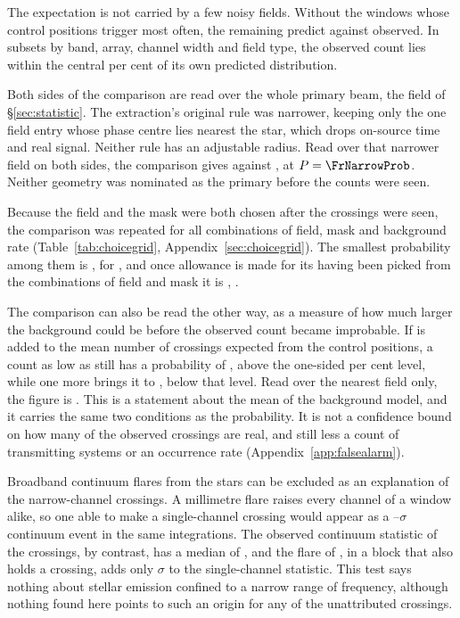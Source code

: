 The expectation is not carried by a few noisy fields. Without the
\BgTopNWord{} windows whose control positions trigger most often, the
remaining \BgDropTenNWin{} predict \BgDropTenExp{} against \BgDropTenObs{}
observed. In \BgConfInOf{} subsets by band, array, channel
width and field type, the observed count lies within the central
\CeCovPct{} per cent of its own predicted distribution.

Both sides of the comparison are read over the whole primary beam, the field
of \S\ref{sec:statistic}. The extraction's original rule was narrower,
keeping only the one field entry whose phase centre lies nearest the star,
which drops on-source time and real signal. Neither rule has an adjustable
radius. Read over that narrower field on both sides, the comparison gives
\FrNarrowObs{} against \FrNarrowExp{}, at $P=\FrNarrowProb$. Neither geometry
was nominated as the primary before the counts were seen.

Because the field and the mask were both chosen after the crossings were
seen, the comparison was repeated for all \CgNCellWord{} combinations of
field, mask and background rate (Table~\ref{tab:choicegrid},
Appendix~\ref{sec:choicegrid}). The smallest probability among them is
\CgMinProb, for \CgMinCell, and once allowance is made for its having been
picked from the \CgNTrialWord{} combinations of field and mask it is
\CgBonfPhrase, \CgVerdictClause.

The comparison can also be read the other way, as a measure of how much
larger the background could be before the observed count became improbable.
If \CeAddLim{} is added to the mean number of crossings expected from the
control positions, a count as low as \CeObs{} still has a probability of
\CeProbAtLim, above the one-sided \CeAlphaPct{} per cent level, while one
more brings it to \CeProbAboveLim, below that level. Read over the nearest field only, the
figure is \FrNarrowAddLim. This is a statement about the mean of
the background model, and it carries the same two conditions as the
probability. It is not a confidence bound on how many of the observed
crossings are real, and still less a count of transmitting systems or an
occurrence rate (Appendix~\ref{app:falsealarm}).

Broadband continuum flares from the stars can be excluded as an
explanation of the narrow-channel crossings. A millimetre flare raises every
channel of a window alike, so one able to make a single-channel crossing
would appear as a \FlPredLo--\FlPredHi$\sigma$ continuum event in the same
integrations. The observed continuum statistic of the crossings, by
contrast, has a median of \FlObsMed, and the \FlEgStar{} flare of
\citet{MacGregor2020}, in a block that also holds a crossing, adds only
\FlEgContrib$\sigma$ to the single-channel statistic. This test says nothing
about stellar emission confined to a narrow range of frequency, although
nothing found here points to such an origin for any of the unattributed
crossings.

